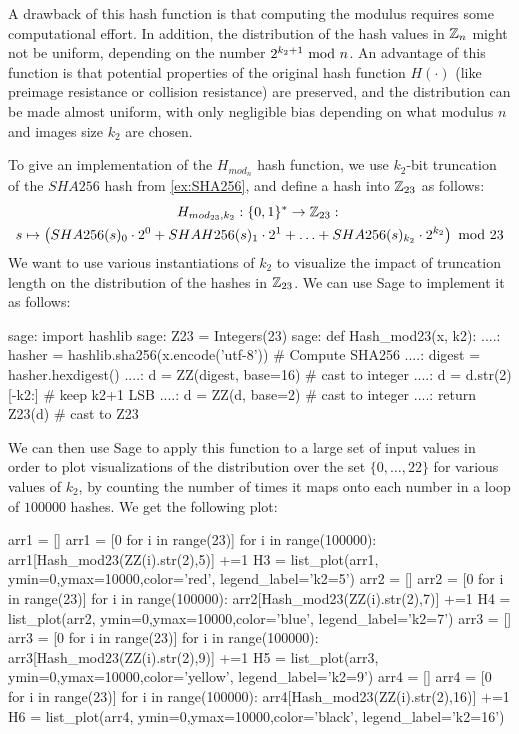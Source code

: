 A drawback of this hash function is that computing the modulus requires some computational effort. In addition, the distribution of the hash values in $\mathbb{Z}_n$ might not be uniform, depending on the number $2^{k_2+1} \text{ mod } n$. An advantage of this function is that potential properties of the original hash function $H(\cdot)$ (like preimage resistance or collision resistance) are preserved, and the distribution can be made almost uniform, with only negligible bias depending on what modulus $n$ and images size $k_2$ are chosen.
\begin{example} To give an implementation of the $H_{mod_n}$ hash function, we use  $k_2$-bit truncation of the $SHA256$ hash from \examplename{} \ref{ex:SHA256}, and define a hash into $\mathbb{Z}_{23}$ as follows:
\begin{multline*}
H_{mod_{23},k_2}: \{0,1\}^* \to \mathbb{Z}_{23}:\; \\
s\mapsto
\left(SHA256(s)_0\cdot 2^0 + SHAH256(s)_1\cdot 2^1 + \ldots + SHA256(s)_{k_2}\cdot 2^{k_2}\right) \text{ mod } 23
\end{multline*}
We want to use various instantiations of $k_2$ to visualize the impact of truncation length on the distribution of the hashes in $\mathbb{Z}_{23}$. We can use Sage to implement it as follows:
\begin{sagecommandline}
sage: import hashlib
sage: Z23 = Integers(23)
sage: def Hash_mod23(x, k2):
....:     hasher = hashlib.sha256(x.encode('utf-8')) # Compute SHA256
....:     digest = hasher.hexdigest()
....:     d = ZZ(digest, base=16) # cast to integer
....:     d = d.str(2)[-k2:] # keep k2+1 LSB
....:     d = ZZ(d, base=2) # cast to integer
....:     return Z23(d) # cast to Z23
\end{sagecommandline}

We can then use Sage to apply this function to a large set of input values in order to plot visualizations of the distribution over the set $\{0,\ldots,22\}$ for various values of $k_2$, by counting the number of times it maps onto each number in a loop of $100000$ hashes. We get the following plot:
\begin{sagesilent}
arr1 = []
arr1 = [0 for i in range(23)]
for i in range(100000):
    arr1[Hash_mod23(ZZ(i).str(2),5)] +=1
H3 = list_plot(arr1, ymin=0,ymax=10000,color='red', legend_label='k2=5')
arr2 = []
arr2 = [0 for i in range(23)]
for i in range(100000):
    arr2[Hash_mod23(ZZ(i).str(2),7)] +=1
H4 = list_plot(arr2, ymin=0,ymax=10000,color='blue', legend_label='k2=7')
arr3 = []
arr3 = [0 for i in range(23)]
for i in range(100000):
    arr3[Hash_mod23(ZZ(i).str(2),9)] +=1
H5 = list_plot(arr3, ymin=0,ymax=10000,color='yellow', legend_label='k2=9')
arr4 = []
arr4 = [0 for i in range(23)]
for i in range(100000):
    arr4[Hash_mod23(ZZ(i).str(2),16)] +=1
H6 = list_plot(arr4, ymin=0,ymax=10000,color='black', legend_label='k2=16')
\end{sagesilent}
\begin{center}
\end{center}
\end{example}

